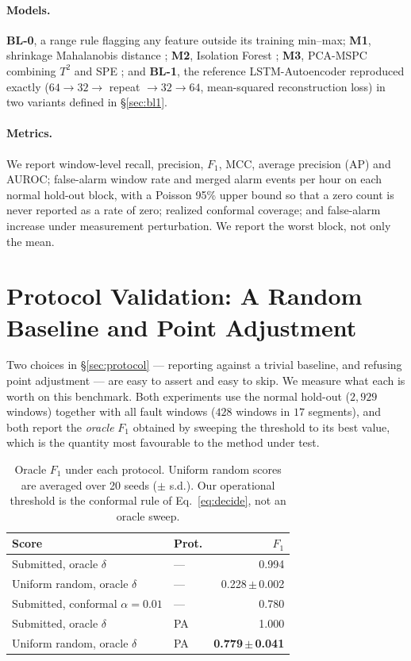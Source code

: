 \documentclass{article}
\begin{document}
\paragraph{Models.} \textbf{BL-0}, a range rule flagging any feature outside
its training min--max; \textbf{M1}, shrinkage Mahalanobis distance
\citep{ledoit2004well}; \textbf{M2}, Isolation Forest \citep{liu2008isolation};
\textbf{M3}, PCA-MSPC combining $T^2$ and SPE \citep{jackson1979control}; and
\textbf{BL-1}, the reference LSTM-Autoencoder reproduced exactly
($64\!\to\!32\!\to$ repeat $\to\!32\!\to\!64$, mean-squared reconstruction
loss) in two variants defined in \S\ref{sec:bl1}.

\paragraph{Metrics.} We report window-level recall, precision, $F_1$, MCC,
average precision (AP) and AUROC; false-alarm window rate and merged alarm
events per hour on each normal hold-out block, with a Poisson 95\% upper bound
so that a zero count is never reported as a rate of zero; realized conformal
coverage; and false-alarm increase under measurement perturbation. We report
the worst block, not only the mean.

\section{Protocol Validation: A Random Baseline and Point Adjustment}
\label{sec:protoval}

Two choices in \S\ref{sec:protocol} --- reporting against a trivial baseline,
and refusing point adjustment --- are easy to assert and easy to skip. We
measure what each is worth on this benchmark. Both experiments use the normal
hold-out ($2{,}929$ windows) together with all fault windows ($428$ windows in
$17$ segments), and both report the \emph{oracle} $F_1$ obtained by sweeping the
threshold to its best value, which is the quantity most favourable to the
method under test.

\begin{table}[t]
\centering\small
\caption{Oracle $F_1$ under each protocol. Uniform random scores are averaged
over 20 seeds ($\pm$ s.d.). Our operational threshold is the conformal rule of
Eq.~\ref{eq:decide}, not an oracle sweep.}
\label{tab:protoval}
\setlength{\tabcolsep}{4pt}
\begin{tabular}{@{}llr@{}}
\toprule
Score & Prot. & $F_1$ \\
\midrule
Submitted, oracle $\delta$ & --- & 0.994 \\
Uniform random, oracle $\delta$ & --- & 0.228\,$\pm$\,0.002 \\
Submitted, conformal $\alpha{=}0.01$ & --- & 0.780 \\
\midrule
Submitted, oracle $\delta$ & PA & 1.000 \\
Uniform random, oracle $\delta$ & PA & \textbf{0.779\,$\pm$\,0.041} \\
\bottomrule
\end{tabular}
\end{table}
\end{document}
